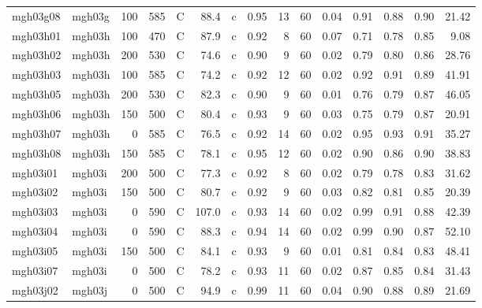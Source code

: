 \documentclass{article}
\begin{document}
\begin{landscape}
\begin{longtable}{llrrlrlrrrrrrrr}
    mgh03g08 &     mgh03g &  100 &  585 &     C &    88.4 &   c &  0.95 &  13 &         60 &  0.04 &  0.91 &  0.88 &  0.90 &   21.42 \\
    mgh03h01 &     mgh03h &  100 &  470 &     C &    87.9 &   c &  0.92 &   8 &         60 &  0.07 &  0.71 &  0.78 &  0.85 &    9.08 \\
    mgh03h02 &     mgh03h &  200 &  530 &     C &    74.6 &   c &  0.90 &   9 &         60 &  0.02 &  0.79 &  0.80 &  0.86 &   28.76 \\
    mgh03h03 &     mgh03h &  100 &  585 &     C &    74.2 &   c &  0.92 &  12 &         60 &  0.02 &  0.92 &  0.91 &  0.89 &   41.91 \\
    mgh03h05 &     mgh03h &  200 &  530 &     C &    82.3 &   c &  0.90 &   9 &         60 &  0.01 &  0.76 &  0.79 &  0.87 &   46.05 \\
    mgh03h06 &     mgh03h &  150 &  500 &     C &    80.4 &   c &  0.93 &   9 &         60 &  0.03 &  0.75 &  0.79 &  0.87 &   20.91 \\
    mgh03h07 &     mgh03h &    0 &  585 &     C &    76.5 &   c &  0.92 &  14 &         60 &  0.02 &  0.95 &  0.93 &  0.91 &   35.27 \\
    mgh03h08 &     mgh03h &  150 &  585 &     C &    78.1 &   c &  0.95 &  12 &         60 &  0.02 &  0.90 &  0.86 &  0.90 &   38.83 \\
    mgh03i01 &     mgh03i &  200 &  500 &     C &    77.3 &   c &  0.92 &   8 &         60 &  0.02 &  0.79 &  0.78 &  0.83 &   31.62 \\
    mgh03i02 &     mgh03i &  150 &  500 &     C &    80.7 &   c &  0.92 &   9 &         60 &  0.03 &  0.82 &  0.81 &  0.85 &   20.39 \\
    mgh03i03 &     mgh03i &    0 &  590 &     C &   107.0 &   c &  0.93 &  14 &         60 &  0.02 &  0.99 &  0.91 &  0.88 &   42.39 \\
    mgh03i04 &     mgh03i &    0 &  590 &     C &    88.3 &   c &  0.94 &  14 &         60 &  0.02 &  0.99 &  0.90 &  0.87 &   52.10 \\
    mgh03i05 &     mgh03i &  150 &  500 &     C &    84.1 &   c &  0.93 &   9 &         60 &  0.01 &  0.81 &  0.84 &  0.83 &   48.41 \\
    mgh03i07 &     mgh03i &    0 &  500 &     C &    78.2 &   c &  0.93 &  11 &         60 &  0.02 &  0.87 &  0.85 &  0.84 &   31.43 \\
    mgh03j02 &     mgh03j &    0 &  500 &     C &    94.9 &   c &  0.99 &  11 &         60 &  0.04 &  0.90 &  0.88 &  0.89 &   21.69 \\

\end{longtable}
\end{landscape}
\end{document}
